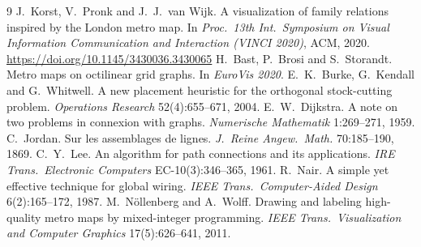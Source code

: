 \documentclass[11pt,a4paper]{article}
\theoremstyle{remark}
\begin{document}
\begin{thebibliography}{9}
 J.~Korst, V.~Pronk and J.~J.~van Wijk. A visualization of family relations inspired by the
  London metro map. In \emph{Proc.\ 13th Int.\ Symposium on Visual Information Communication and Interaction
  (VINCI 2020)}, ACM, 2020. \url{https://doi.org/10.1145/3430036.3430065}
 H.~Bast, P.~Brosi and S.~Storandt. Metro maps on octilinear grid graphs. In \emph{EuroVis 2020}.
 E.~K.~Burke, G.~Kendall and G.~Whitwell. A new placement heuristic for the orthogonal
  stock-cutting problem. \emph{Operations Research} 52(4):655--671, 2004.
 E.~W.~Dijkstra. A note on two problems in connexion with graphs. \emph{Numerische
  Mathematik} 1:269--271, 1959.
 C.~Jordan. Sur les assemblages de lignes. \emph{J.\ Reine Angew.\ Math.} 70:185--190, 1869.
 C.~Y.~Lee. An algorithm for path connections and its applications. \emph{IRE Trans.\ Electronic
  Computers} EC-10(3):346--365, 1961.
 R.~Nair. A simple yet effective technique for global wiring. \emph{IEEE Trans.\ Computer-Aided
  Design} 6(2):165--172, 1987.
 M.~N\"ollenberg and A.~Wolff. Drawing and labeling high-quality metro maps by mixed-integer
  programming. \emph{IEEE Trans.\ Visualization and Computer Graphics} 17(5):626--641, 2011.
\end{thebibliography}
\end{document}
